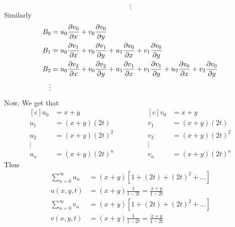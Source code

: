 \documentclass[]{article}
\begin{document}
\begin{example}
\begin{align*}
        \\
        \vdots
    \end{align*}
    Similarly
    \begin{align*}
        B_0 & = u_0 \pdv{v_0}{x}+v_0 \pdv{v_0}{y}
        \\
        B_1 & = u_0 \pdv{v_1}{x} + v_0 \pdv{v_1}{y} + u_1 \pdv{v_0}{x} + v_1 \pdv{v_0}{y}
        \\
        B_2 & = u_0 \pdv{v_2}{x} + v_0 \pdv{v_2}{y} + u_1 \pdv{v_1}{x} + v_1 \pdv{v_1}{y} + u_2 \pdv{v_0}{x} + v_2 \pdv{v_0}{y}
        \\
        \vdots
    \end{align*}
    Now, We get that
    \begin{equation*}
        \begin{aligned}[c]
            u_0 & =  x+y
            \\
            u_1 & = (x+y)(2t)
            \\
            u_2 & = (x+y)(2t)^2
            \\
            \vdots
            \\
            u_n & = (x+y)(2t)^n
        \end{aligned}
        \qquad\qquad
        \begin{aligned}[c]
            v_0 & =  x+y
            \\
            v_1 & = (x+y)(2t)
            \\
            v_2 & = (x+y)(2t)^2
            \\
            \vdots
            \\
            v_n & = (x+y)(2t)^n
        \end{aligned}
    \end{equation*}
    Thus
    \begin{align*}
        \sum_{n=0}^{\infty} u_n & =(x+y)\left[ 1+(2t) + (2t)^2 + \dots \right] \\
        u(x,y,t)                & =(x+y)\frac{1}{1-2t} = \frac{x+y}{1-2t}      \\
        \sum_{n=0}^{\infty} v_n & =(x+y)\left[ 1+(2t) + (2t)^2 + \dots \right] \\
        v(x,y,t)                & =(x+y)\frac{1}{1-2t} = \frac{x+y}{1-2t}      \\
    \end{align*}
\end{example}
\newpage
\setcounter{equation}{0}
\end{document}
